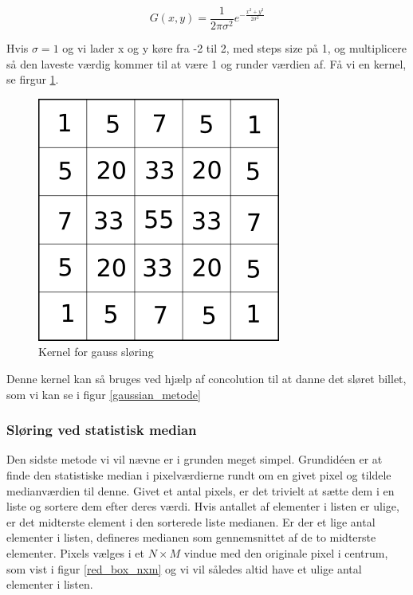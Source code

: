 {\begin{equation}
	G(x,y) = \frac{1}{2\pi\sigma^2}e^{-\frac{x^2+y^2}{2\sigma^2}}
\end{equation}

Hvis $\sigma = 1$ og vi lader x og y køre fra -2 til 2, med steps size på 1, og multiplicere så den laveste værdig kommer til at være 1 og runder værdien af. Få vi en kernel, se firgur \ref{gauss}.

\begin{figure}[h]
	\begin{center}
		\includegraphics[scale=0.5,angle=0]{afsnit/vores_implementation/billeder/sloering/gauss}
	\end{center}
	\caption[]{Kernel for gauss sløring}
	\label{gauss}
\end{figure}

Denne kernel kan så bruges ved hjælp af concolution til at danne det sløret billet, som vi kan se i figur \ref{gaussian_metode}

\subsubsection*{Sløring ved statistisk median}
Den sidste metode vi vil nævne er i grunden meget simpel. Grundidéen er
at finde den statistiske median i pixelværdierne rundt om en givet pixel
og tildele medianværdien til denne. Givet et antal pixels, er det
trivielt at sætte dem i en liste og sortere dem efter deres værdi. Hvis
antallet af elementer i listen er ulige, er det midterste element i den
sorterede liste medianen. Er der et lige antal elementer i listen,
defineres medianen som gennemsnittet af de to midterste elementer.
Pixels vælges i et $N \times M$ vindue med den originale pixel i
centrum, som vist i figur \ref{red_box_nxm} og vi vil således altid have
et ulige antal elementer i listen.

}
